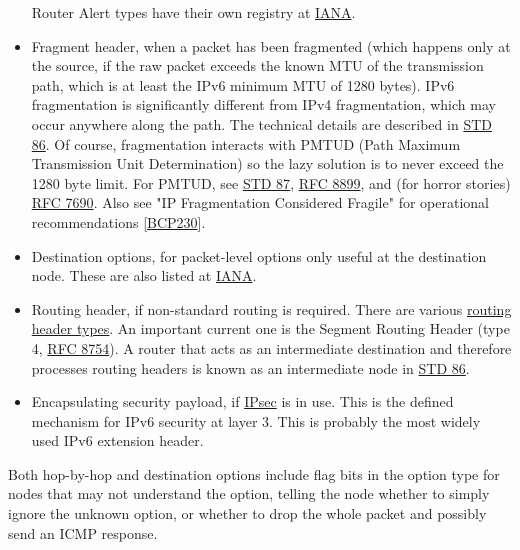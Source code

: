 \documentclass[
]{article}
\begin{document}
\begin{itemize}
  Router Alert types have their own registry at
  \href{https://www.iana.org/assignments/ipv6-routeralert-values/ipv6-routeralert-values.xhtml}{IANA}.
\item
  Fragment header, when a packet has been fragmented (which happens only
  at the source, if the raw packet exceeds the known MTU of the
  transmission path, which is at least the IPv6 minimum MTU of 1280
  bytes). IPv6 fragmentation is significantly different from IPv4
  fragmentation, which may occur anywhere along the path. The technical
  details are described in
  \href{https://www.rfc-editor.org/info/std86}{STD 86}. Of course,
  fragmentation interacts with PMTUD (Path Maximum Transmission Unit
  Determination) so the lazy solution is to never exceed the 1280 byte
  limit. For PMTUD, see \href{https://www.rfc-editor.org/info/std87}{STD
  87}, \href{https://www.rfc-editor.org/info/rfc8899}{RFC 8899}, and
  (for horror stories)
  \href{https://www.rfc-editor.org/info/rfc7690}{RFC 7690}. Also see "IP
  Fragmentation Considered Fragile" for operational recommendations
  {[}\href{https://www.rfc-editor.org/info/bcp230}{BCP230}{]}.
\item
  Destination options, for packet-level options only useful at the
  destination node. These are also listed at
  \href{https://www.iana.org/assignments/ipv6-parameters/ipv6-parameters.xhtml\#ipv6-parameters-2}{IANA}.
\item
  Routing header, if non-standard routing is required. There are various
  \href{https://www.iana.org/assignments/ipv6-parameters/ipv6-parameters.xhtml\#ipv6-parameters-2}{routing
  header types}. An important current one is the Segment Routing Header
  (type 4, \href{https://www.rfc-editor.org/info/rfc8754}{RFC 8754}). A
  router that acts as an intermediate destination and therefore
  processes routing headers is known as an \textquotesingle intermediate
  node\textquotesingle{} in
  \href{https://www.rfc-editor.org/info/std86}{STD 86}.
\item
  Encapsulating security payload, if
  \href{https://www.rfc-editor.org/info/rfc4303}{IPsec} is in use. This
  is the defined mechanism for IPv6 security at layer 3. This is
  probably the most widely used IPv6 extension header.
\end{itemize}

Both hop-by-hop and destination options include flag bits in the option
type for nodes that may not understand the option, telling the node
whether to simply ignore the unknown option, or whether to drop the
whole packet and possibly send an ICMP response.
\end{document}
